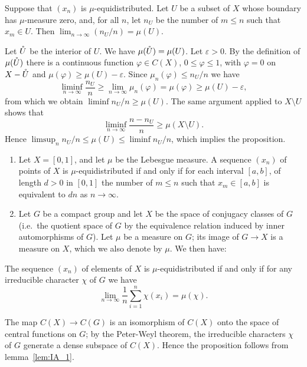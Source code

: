 \begin{subappendices}
\begin{prop}
Suppose that $(x_n)$ is $\mu$-equidistributed. Let $U$ be a subset of $X$ whose
boundary has $\mu$-measure zero, and, for all $n$, let $n_U$ be the number of
$m \le n$ such that $x_m \in U$. Then $\lim_{n\to\infty} (n_U/n) = \mu(U)$.
\end{prop}
Let $\mathring{U}$ be the interior of $U$. We have $\mu(\mathring{U}) = \mu(U)$.  Let
$\varepsilon > 0$.  By the definition of $\mu(\mathring{U})$ there is a continuous
function $\varphi \in C(X)$, $0 \le \varphi \le 1$, with $\varphi = 0$ on $X
- \mathring{U}$ and $\mu(\varphi) \ge \mu(U) - \varepsilon$.  Since
$\mu_n(\varphi) \le n_U/n$ we have
\[
	\liminf_{n\to\infty} \frac{n_U}{n} \ge \lim_{n\to\infty} \mu_n(\varphi)
	= \mu(\varphi) \ge \mu(U) - \varepsilon,
\]
\dpage
from which we obtain $\liminf n_U/n \ge \mu(U)$. The same argument
applied to $X \setminus U$ shows that
$$ \liminf_{n\to\infty} \frac{n - n_U}{n} \ge \mu(X \setminus U). $$
Hence $\limsup_n n_U/n \le \mu(U) \le \liminf n_U/n$, which implies the
proposition.

\begin{ex}
\begin{enumerate}[label=\arabic*., ref=\arabic*]
\item Let $X = [0,1]$, and let $\mu$ be the Lebesgue measure. A sequence
	$(x_n)$ of points of $X$ is $\mu$-equidistributed if and only if for
	each interval $[a, b]$, of length $d > 0$ in $[0,1]$ the number of $m
	\le n$ such that $x_m \in [a, b]$ is equivalent to $dn$ as $n \to
	\infty$.
\item\label{ex:IA1_2}
	Let $G$ be a compact group and let $X$ be the space of conjugacy classes
	of $G$ (i.e.\ the quotient space of $G$ by the equivalence relation
	induced by inner automorphisms of $G$). Let $\mu$ be a measure on $G$;
	its image of $G \to X$ is a measure on $X$, which we also denote by
	$\mu$. We then have:
\end{enumerate}
\end{ex}

\begin{prop}\label{prop:I_A1_2}
The sequence $(x_n)$ of elements of $X$ is $\mu$-equidistributed if and only if
for any irreducible character $\chi$ of $G$ we have
$$ \lim_{n\to\infty} \frac{1}{n} \sum_{i=1}^{n} \chi(x_i) = \mu(\chi). $$
\end{prop}

The map $C(X) \to C(G)$ is an isomorphism of $C(X)$ onto the
space of central functions on $G$; by the Peter-Weyl theorem, the
\dpage
irreducible characters $\chi$ of $G$ generate a dense subspace of $C(X)$.
Hence the proposition follows from lemma~\ref{lem:IA_1}.


\end{subappendices}
